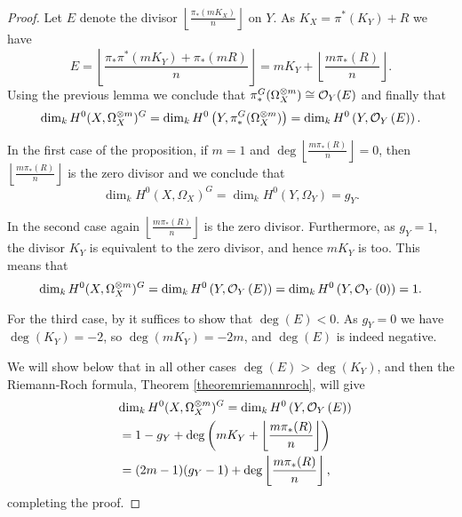     \begin{proof}
    Let $E$ denote the divisor $\left\lfloor \frac{\pi_*(mK_X)}{n} \right\rfloor$ on $Y$. As $K_X=\pi^*(K_Y)+R$ we have
        \[ 
        E = 
        \left \lfloor \frac{\pi_*\pi^*(mK_Y) + \pi_*(mR)}{n} \right \rfloor =
        mK_Y + \left \lfloor \frac{m\pi_*(R)}{n} \right \rfloor.
        \]
    Using the previous lemma we conclude that $\pi_*^G(\Omega_X^{\otimes m}) \cong {\cal O}_Y (E)$ and finally that
        \begin{equation*}
        \dim_k H^0(X,\Omega_X^{\otimes m})^G 
        = \dim_k H^0\left(Y, \pi_*^G(\Omega_X^{\otimes m})\right)
        = \dim_k H^0\left(Y, {\cal O}_Y\left( E \right) \right).
        \end{equation*}
    
    
    In the first case of the proposition, \ie if $m=1$ and $\deg \left\lfloor\frac{m\pi_*(R)}{n} \right\rfloor=0$, then $\left\lfloor\frac{m\pi_*(R)}{n} \right\rfloor$ is the zero divisor and we conclude that 
        \begin{equation*}
        \dim_kH^0(X,\Omega_X)^G = \dim_kH^0(Y, \Omega_Y) = g_Y.
        \end{equation*}
    
    
    In the second case again $\left\lfloor \frac{m\pi_*(R)}{n} \right\rfloor$ is the zero divisor. 
    Furthermore, as $g_Y=1$, the divisor $K_Y$ is equivalent to the zero divisor, and hence $mK_Y$ is too. 
    This means that
        \begin{equation*}
        \dim_kH^0(X,\Omega_X^{\otimes m})^G = \dim_kH^0\left( Y,{\cal O}_Y\left( E \right) \right) 
        = \dim_k  H^0\left( Y,{\cal O}_Y\left( 0 \right) \right)
        = 1.
        \end{equation*}
    
    
    For the third case, by \cite[Chap. IV, ex. 1.3.4]{hart} it suffices to show that $\deg \left( E \right) < 0$.
    As $g_Y=0$ we have $\deg(K_Y)=-2$, so $\deg(mK_Y)=-2m$, and $\deg \left( E \right)$ is indeed negative.
    
    
    
    We will show below that in all other cases $\deg(E) > \deg(K_Y)$, and then the Riemann-Roch formula, Theorem \ref{theoremriemannroch}, will give 
        \begin{align*}
        \lefteqn{\dim_kH^0(X,\Omega_X^{\otimes m})^G = \dim_kH^0\left(Y,\cO_Y\left( E \right)\right)} \\
        & =  1-g_Y+\deg\left(mK_Y+\left\lfloor{\frac{m\pi_*(R)}{n}}\right\rfloor\right) \\
        & =  (2m-1)(g_Y-1)+\deg\left\lfloor{\frac{m\pi_*(R)}{n}}\right\rfloor,
        \end{align*}
    completing the proof.
    

\end{proof}
